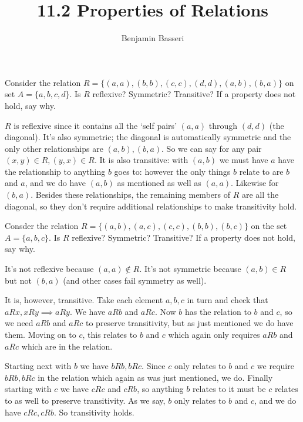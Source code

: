 \documentclass{article}
\title{11.2 Properties of Relations}
\author{Benjamin Basseri}
\begin{document}
\maketitle

\begin{problem}
Consider the relation $R = \{(a, a), (b, b), (c, c), (d, d), (a, b), (b, a)\}$ on set $A = \{a, b, c, d\}$. Is $R$ reflexive? Symmetric? Transitive? If a property does not hold, say why.
\end{problem}

$R$ is reflexive since it contains all the `self pairs' $(a, a)$ through $(d, d)$ (the diagonal). It's also symmetric; the diagonal is automatically symmetric and the only other relationships are $(a, b), (b, a)$. So we can say for any pair $(x, y) \in R, (y, x) \in R$. It is also transitive: with $(a, b)$ we must have $a$ have the relationship to anything $b$ goes to: however the only things $b$ relate to are $b$ and $a$, and we do have $(a, b)$ as mentioned as well as $(a, a)$. Likewise for $(b, a)$. Besides these relationships, the remaining members of $R$ are all the diagonal, so they don't require additional relationships to make transitivity hold.

\begin{problem}
Consder the relation $R =\{(a, b), (a, c), (c, c), (b, b), (b, c)\}$ on the set $A = \{a, b, c\}$. Is $R$ reflexive? Symmetric? Transitive? If a property does not hold, say why.
\end{problem}

It's not reflexive because $(a, a) \not\in R$. It's not symmetric because $(a, b) \in R$ but not $(b, a)$ (and other cases fail symmetry as well).

It is, however, transitive. Take each element $a, b, c$ in turn and check that $aRx, xRy \implies aRy$. We have $aRb$ and $aRc$. Now $b$ has the relation to $b$ and $c$, so we need $aRb$ and $aRc$ to preserve transitivity, but as just mentioned we do have them. Moving on to $c$, this relates to $b$ and $c$ which again only requires $aRb$ and $aRc$ which are in the relation.

Starting next with $b$ we have $bRb, bRc$. Since $c$ only relates to $b$ and $c$ we require $bRb, bRc$ in the relation which again as was just mentioned, we do. Finally starting with $c$ we have $cRc$ and $cRb$, so anything $b$ relates to it must be $c$ relates to as well to preserve transitivity. As we say, $b$ only relates to $b$ and $c$, and we do have $cRc, cRb$. So transitivity holds.
\end{document}
